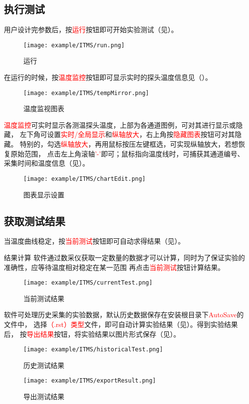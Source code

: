 \subsection{执行测试}
用户设计完参数后，按\textcolor{red}{运行}按钮即可开始实验测试（见）。
\begin{figure}[H]
	\centering
	\texttt{[image: example/ITMS/run.png]}
	\caption{ 运行 \label{fig:exmp_itms_run}}
\end{figure}
在运行的时候，按\textcolor{red}{温度监控}按钮即可显示实时的探头温度信息见（）。
\begin{figure}[H]
	\centering
	\texttt{[image: example/ITMS/tempMirror.png]}
	\caption{ 温度监视图表 \label{fig:exmp_itms_tempMirror}}
\end{figure}
\textcolor{red}{温度监控}可实时显示各测温探头温度，上部为各通道图例，可对其进行显示或隐藏，
左下角可设置\textcolor{red}{实时/全局显示}和\textcolor{red}{纵轴放大}，右上角按\textcolor{red}{隐藏图表}按钮可对其隐藏。
特别的，勾选\textcolor{red}{纵轴放大}，再用鼠标按压左键框选，可实现纵轴放大，若想恢复原始范围，
点击左上角滚轴\textcolor{red}{'-'}即可；鼠标指向温度线时，可捕获其通道编号、采集时间和温度信息（见）。\\
\begin{figure}[H]
	\centering
	\texttt{[image: example/ITMS/chartEdit.png]}
	\caption{ 图表显示设置 \label{fig:exmp_itms_chartEdit}}
\end{figure}

\subsection{获取测试结果}
	当温度曲线稳定，按\textcolor{red}{当前测试}按钮即可自动求得结果（见）。
\begin{tips}{结果计算}
	软件通过数采仪获取一定数量的数据才可以计算，同时为了保证实验的准确性，应等待温度相对稳定在某一范围
再点击\textcolor{red}{当前测试}按钮计算结果。
\end{tips}
\begin{figure}[H]
	\centering
	\texttt{[image: example/ITMS/currentTest.png]}
	\caption{ 当前测试结果 \label{fig:exmp_itms_currentTest}}
\end{figure}
软件可处理历史采集的实验数据，默认历史数据保存在安装根目录下\textcolor{red}{AutoSave}的文件中，
选择\textcolor{red}{（.rst）类型}文件，即可自动计算实验结果（见）。得到实验结果后，
按\textcolor{red}{导出结果}按钮，将实验结果以图片形式保存（见）。
\begin{figure}[H]
	\centering
	\texttt{[image: example/ITMS/historicalTest.png]}
	\caption{ 历史测试结果 \label{fig:exmp_itms_historicalTest}}
\end{figure}

\begin{figure}[H]
	\centering
	\texttt{[image: example/ITMS/exportResult.png]}
	\caption{ 导出测试结果 \label{fig:exmp_itms_exportResult}}
\end{figure}